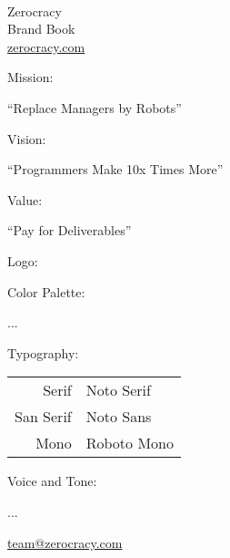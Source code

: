 \documentclass{article}
\date{\today}
\newcommand\slide[1]{%
  \pagebreak\topskip0pt\vspace*{\fill}%
  \begin{center}\LARGE%
  #1
  \end{center}%
  \vspace*{\fill}}
\begin{document}
\setlength{\parindent}{0pt} %

\sffamily


\newcommand\header[1]{{\LARGE #1:\\[1em]\par}}

\slide{%
  \\
  Zerocracy
  \\[1em]
  \large
  Brand Book\\
  \href{https://www.zerocracy.com}{zerocracy.com}}

\slide{
  \header{Mission}
  \par
  {\Huge \enquote{Replace Managers by Robots}\par}}

\slide{
  \header{Vision}
  \par
  {\Huge \enquote{Programmers Make 10x Times More}\par}}

\slide{
  \header{Value}
  \par
  {\Huge \enquote{Pay for Deliverables}\par}}

\slide{
  \header{Logo}
  \par
  }

\slide{
  \header{Color Palette}
  \par
  ...}

\slide{
  \header{Typography}
  \par
  \begin{tabular}{rl}
  \toprule
  Serif & {\rmfamily Noto Serif} \\
  San Serif & {\sffamily Noto Sans} \\
  Mono & {\ttfamily Roboto Mono} \\
  \bottomrule
  \end{tabular}}

\slide{
  \header{Voice and Tone}
  \par
  ...}

\slide{%
  \href{mailto:team@zerocracy.com}{team@zerocracy.com}}
\end{document}
